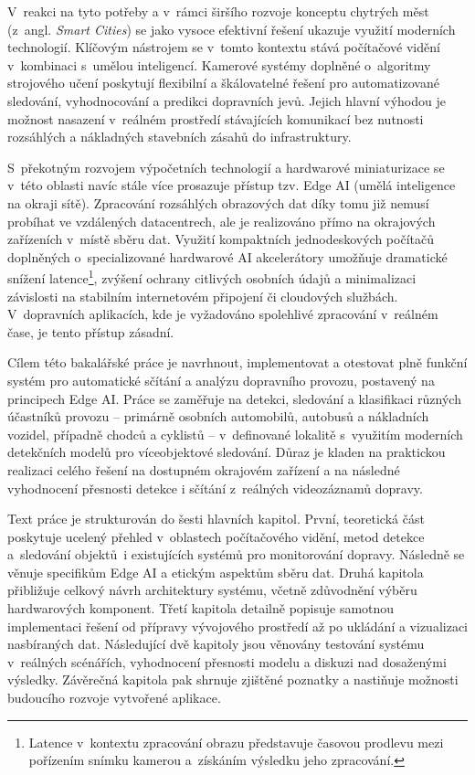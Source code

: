 V~reakci na tyto potřeby a v~rámci širšího rozvoje konceptu chytrých měst (z~angl. \textit{Smart Cities}) se jako vysoce efektivní řešení ukazuje využití moderních technologií. Klíčovým nástrojem se v~tomto kontextu stává počítačové vidění v~kombinaci s~umělou inteligencí. Kamerové systémy doplněné o~algoritmy strojového učení poskytují flexibilní a škálovatelné řešení pro automatizované sledování, vyhodnocování a predikci dopravních jevů. Jejich hlavní výhodou je možnost nasazení v~reálném prostředí stávajících komunikací bez nutnosti rozsáhlých a nákladných stavebních zásahů do infrastruktury.

S~překotným rozvojem výpočetních technologií a hardwarové miniaturizace se v~této oblasti navíc stále více prosazuje přístup tzv. \acs{Edge AI} (umělá inteligence na okraji sítě). Zpracování rozsáhlých obrazových dat díky tomu již nemusí probíhat ve vzdálených datacentrech, ale je realizováno přímo na okrajových zařízeních v~místě sběru dat. Využití kompaktních jednodeskových počítačů doplněných o~specializované hardwarové AI akcelerátory umožňuje dramatické snížení latence\footnote{Latence v~kontextu zpracování obrazu představuje časovou prodlevu mezi pořízením snímku kamerou a~získáním výsledku jeho zpracování.}, zvýšení ochrany citlivých osobních údajů a minimalizaci závislosti na stabilním internetovém připojení či cloudových službách. V~dopravních aplikacích, kde je vyžadováno spolehlivé zpracování v~reálném čase, je tento přístup zásadní.

Cílem této bakalářské práce je navrhnout, implementovat a otestovat plně funkční systém pro automatické sčítání a analýzu dopravního provozu, postavený na principech Edge AI. Práce se zaměřuje na detekci, sledování a klasifikaci různých účastníků provozu – primárně osobních automobilů, autobusů a nákladních vozidel, případně chodců a cyklistů – v~definované lokalitě s~využitím moderních detekčních modelů pro víceobjektové sledování. Důraz je kladen na praktickou realizaci celého řešení na dostupném okrajovém zařízení a na následné vyhodnocení přesnosti detekce i sčítání z~reálných videozáznamů dopravy.

Text práce je strukturován do šesti hlavních kapitol. První, teoretická část poskytuje ucelený přehled v~oblastech počítačového vidění, metod detekce a~sledování objektů~i existujících systémů pro monitorování dopravy. Následně se věnuje specifikům Edge AI a etickým aspektům sběru dat. Druhá kapitola přibližuje celkový návrh architektury systému, včetně zdůvodnění výběru hardwarových komponent. Třetí kapitola detailně popisuje samotnou implementaci řešení od přípravy vývojového prostředí až po ukládání a vizualizaci nasbíraných dat. Následující dvě kapitoly jsou věnovány testování systému v~reálných scénářích, vyhodnocení přesnosti modelu a diskuzi nad dosaženými výsledky. Závěrečná kapitola pak shrnuje zjištěné poznatky a nastiňuje možnosti budoucího rozvoje vytvořené aplikace.
